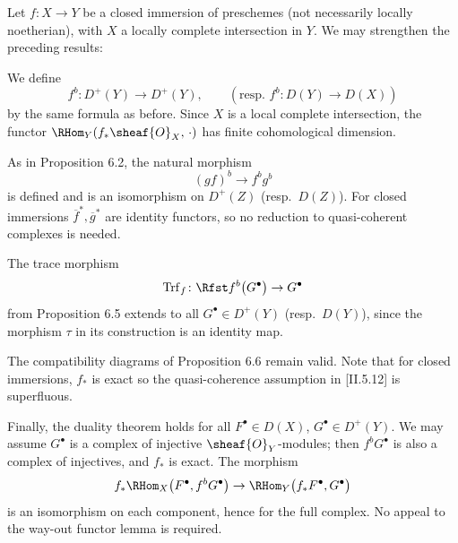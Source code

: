 \setcounter{page}{173}
\begin{remark}
Let \(f: X \to Y\) be a closed immersion of preschemes (not necessarily locally noetherian), with \(X\) a locally complete intersection in \(Y\). We may strengthen the preceding results:

We define
\[
f^{b}\colon D^{+}(Y) \to D^{+}(Y), \qquad
(\text{resp. } f^{b}\colon D(Y) \to D(X))
\]
by the same formula as before. Since \(X\) is a local complete intersection, the functor \(\RHom_Y(f_*\sheaf{O}_X,\,\cdot)\) has finite cohomological dimension.

As in Proposition 6.2, the natural morphism
\[
(g f)^{b} \to f^{b} g^{b}
\]
is defined and is an isomorphism on \(D^+(Z)\) (resp.\ \(D(Z)\)). For closed immersions \(\overline{f}^*,\overline{g}^*\) are identity functors, so no reduction to quasi-coherent complexes is needed.

The trace morphism
\[
\operatorname{Trf}_{f}\colon \Rfst f^{b}\bigl(G^\bullet\bigr) \to G^\bullet
\]
from Proposition 6.5 extends to all \(G^\bullet\in D^+(Y)\) (resp.\ \(D(Y)\)), since the morphism \(\tau\) in its construction is an identity map.

The compatibility diagrams of Proposition 6.6 remain valid. Note that for closed immersions, \(f_*\) is exact so the quasi-coherence assumption in [II.5.12] is superfluous.

Finally, the duality theorem holds for all \(F^\bullet\in D(X)\), \(G^\bullet\in D^+(Y)\). We may assume \(G^\bullet\) is a complex of injective \(\sheaf{O}_Y\)-modules; then \(f^b G^\bullet\) is also a complex of injectives, and \(f_*\) is exact. The morphism
\[
f_*\RHom_X\bigl(F^\bullet,f^b G^\bullet\bigr)
\to \RHom_Y\bigl(f_*F^\bullet,G^\bullet\bigr)
\]
is an isomorphism on each component, hence for the full complex. No appeal to the way-out functor lemma is required.

\setcounter{page}{174}
\end{remark}

